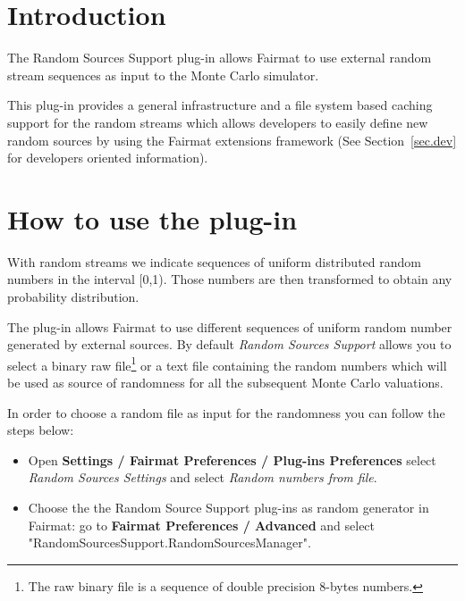 \newcommand{\pluginName}{Random Sources Support}
\newcommand{\pluginVersion}{1.0}





\PluginTitle{\pluginName}{\pluginVersion}

\section{Introduction}

The Random Sources Support plug-in allows Fairmat to use external random stream sequences as input to the Monte Carlo simulator.

This plug-in provides a general infrastructure and a file system based caching support for the random streams which allows developers to easily define new random sources by using the Fairmat extensions framework (See Section~\ref{sec.dev} for developers oriented information). 

\section{How to use the plug-in}

With random streams we indicate sequences of uniform distributed random numbers in the interval [0,1). Those numbers are then transformed to obtain any probability distribution.

The plug-in allows Fairmat to use different sequences of uniform random number generated by external sources. 
By default \emph{Random Sources Support} allows you to select a binary raw file\footnote{The raw binary file is a sequence of double precision 8-bytes numbers.} or a text file containing the random numbers which will be used as source of randomness for all the subsequent Monte Carlo valuations.

In order to choose a random file as input for the randomness you can follow the steps below:

\begin{itemize}
\item Open \textbf{Settings / Fairmat Preferences / Plug-ins Preferences} select \emph{Random Sources Settings} and select \emph{Random numbers from file}.
\item Choose the  the Random Source Support plug-ins as random generator in Fairmat: go to \textbf{Fairmat Preferences / Advanced} and select "RandomSourcesSupport.RandomSourcesManager".
\end{itemize}

